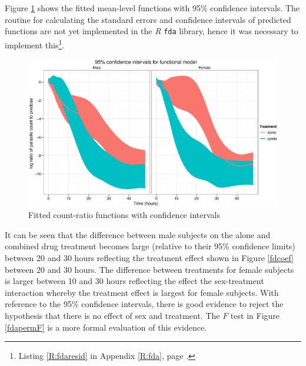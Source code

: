 \newpage
Figure \ref{fdfitted} shows the fitted mean-level functions with 95\% confidence intervals. The routine for calculating the standard errors and confidence intervals of predicted functions are not yet implemented in the \emph{R} \texttt{fda} library, hence it was necessary to implement this\footnote{Listing \ref{R:fdaresid} in Appendix \ref{R:fda}, page \pageref{R:fdaresid}.}.
\begin{figure}[p]
\includegraphics[width=150mm]{lprr2i.eps} 
\caption{Fitted count-ratio functions with confidence intervals}
\label{fdfitted}
\end{figure}
It can be seen that the difference between male subjects on the alone and combined drug treatment becomes large (relative to their 95\% confidence limits) between 20 and 30 hours reflecting the treatment effect shown in Figure \ref{fdcoef} between 20 and 30 hours. The difference between treatments for female subjects is larger between 10 and 30 hours reflecting the effect the sex-treatment interaction whereby the treatment effect is largest for female subjects. With reference to the 95\% confidence intervals, there is good evidence to reject the hypothesis that there is no effect of sex and treatment. The $F$ test in Figure \ref{fdapermF} is a more formal evaluation of this evidence.


